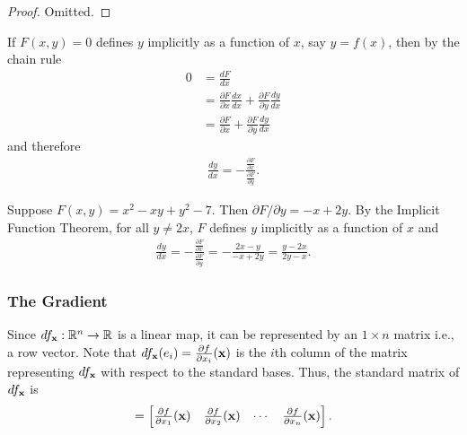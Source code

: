 \documentclass[12pt,letterpaper,reqno]{article}
\numberwithin{equation}{section}
\newcommand{\R}{\ensuremath{\mathbb R}}
\newcommand{\bx}{{\bf x}}
\newcommand{\fixme}[1]{{\color{orange}{[#1]}}}
\begin{document}
{\begin{proof}
	Omitted.
\end{proof}

If $F(x,y)=0$ defines $y$ implicitly as a function of $x$, say $y=f(x)$, then by the chain rule
\begin{align*}
	0&=\frac{d F}{d x} \\
	&=\frac{\partial F}{\partial x}\frac{dx}{dx}+ \frac{\partial F}{\partial y}\frac{dy}{dx}\\
	&=\frac{\partial F}{\partial x}+ \frac{\partial F}{\partial y}\frac{dy}{dx}
\end{align*}
and therefore
\begin{align*}
	\frac{dy}{dx}=-\frac{\frac{\partial F}{\partial x}}{\frac{\partial F}{\partial y}}.
\end{align*}

\begin{example}
Suppose $F(x,y)=x^2-xy+y^2-7$. Then $\partial F/\partial y=-x+2y$. By the Implicit Function Theorem, for all $y \neq 2x$, $F$ defines $y$ implicitly as a function of $x$ and 
\begin{align*}
	\frac{dy}{dx}=-\frac{\frac{\partial F}{\partial x}}{\frac{\partial F}{\partial y}}=-\frac{2x-y}{-x+2y}=\frac{y-2x}{2y-x}.
\end{align*}
\end{example}

\subsubsection{The Gradient}
Since $df_\bx:\R^n \to \R$ is a linear map, it can be represented by an $1 \times n$ matrix i.e., a row vector. \fixme{Refer to my linear algebra notes.} Note that $df_\bx(e_i)=\frac{\partial f}{\partial x_i}(\bx)$ is the $i$th column of the matrix representing $df_\bx$ with respect to the standard bases. Thus, the standard matrix of $df_\bx$ is 
\begin{align*}
	[df_\bx]=\begin{bmatrix}
		\frac{\partial f}{\partial x_1}(\bx) & \frac{\partial f}{\partial x_2}(\bx) & \cdots & \frac{\partial f}{\partial x_n}(\bx)
	\end{bmatrix}.
\end{align*}

}
\end{document}
